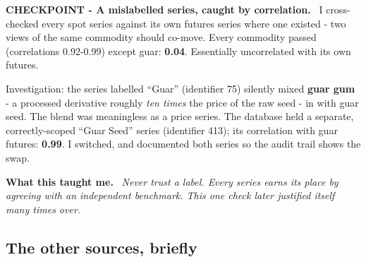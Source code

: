 \documentclass[11pt]{article}
\newenvironment{checkpoint}[1]
  {\begin{framed}\noindent\textbf{CHECKPOINT - #1.}\ }
  {\end{framed}}
\newenvironment{lesson}
  {\begin{framed}\noindent\textbf{What this taught me.}\ \itshape}
  {\end{framed}}
\begin{document}
\begin{checkpoint}{A mislabelled series, caught by correlation}
I cross-checked every spot series against its own futures series where one existed - two
views of the same commodity should co-move. Every commodity passed (correlations
0.92-0.99) except guar: \textbf{0.04}. Essentially uncorrelated with its own futures.
\end{checkpoint}

Investigation: the series labelled ``Guar'' (identifier 75) silently mixed \textbf{guar
gum} - a processed derivative roughly \emph{ten times} the price of the raw seed - in with
guar seed. The blend was meaningless as a price series. The database held a separate,
correctly-scoped ``Guar Seed'' series (identifier 413); its correlation with guar futures:
\textbf{0.99}. I switched, and documented both series so the audit trail shows the swap.

\begin{lesson}
Never trust a label. Every series earns its place by agreeing with an independent
benchmark. This one check later justified itself many times over.
\end{lesson}

\subsection{The other sources, briefly}
\end{document}
